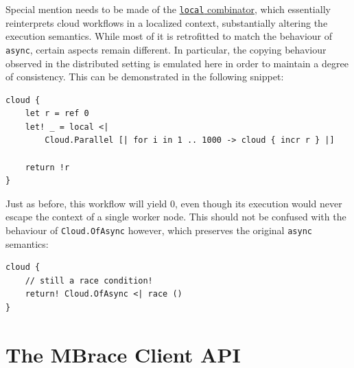 \documentclass[9pt,a4paper]{article}
\newcommand{\TitularMbrace}{MBrace}
\begin{document}
\label{localSemantics}
Special mention needs to be made of the \hyperref[localCombinator]{\texttt{local} combinator},
which essentially reinterprets cloud workflows in a localized context,
substantially altering the execution semantics. While most of it is retrofitted
to match the behaviour of \texttt{async}, certain aspects remain different.
In particular, the copying behaviour observed in the distributed setting is emulated here
in order to maintain a degree of consistency. This can be demonstrated in the following
snippet:
\begin{lstlisting}
cloud {
    let r = ref 0
    let! _ = local <| 
    	Cloud.Parallel [| for i in 1 .. 1000 -> cloud { incr r } |]

    return !r
}
\end{lstlisting}
Just as before, this workflow will yield 0, even though its execution would never
escape the context of a single worker node. This should not be confused with the
behaviour of \texttt{Cloud.OfAsync} however, which preserves the original \texttt{async}
semantics:
\begin{lstlisting}
cloud {
	// still a race condition!
	return! Cloud.OfAsync <| race ()
}
\end{lstlisting}


%
%
%

\section{The \TitularMbrace{} Client API}
\label{sec:client}
\end{document}
